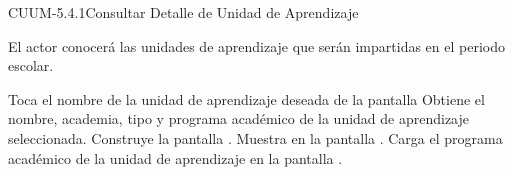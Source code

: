 \begin{UseCase}{CUUM-5.4.1}{Consultar Detalle de Unidad de Aprendizaje}
{\begin{UClist}
				 El actor conocerá las unidades de aprendizaje que serán impartidas en el periodo escolar.
			\end{UClist}
		}
	\end{UseCase}
	
	
	\begin{UCtrayectoria}
		\UCpaso[\UCactor] Toca el nombre de la unidad de aprendizaje deseada de la pantalla 
		\UCpaso[\UCsist] Obtiene el nombre, academia, tipo y programa académico de la unidad de aprendizaje seleccionada.
		\UCpaso[\UCsist] Construye la pantalla .
		\UCpaso[\UCsist] Muestra en la pantalla .
		\UCpaso[\UCsist] Carga el programa académico de la unidad de aprendizaje en la pantalla .
		
	\end{UCtrayectoria}
	
	
	
	
	
